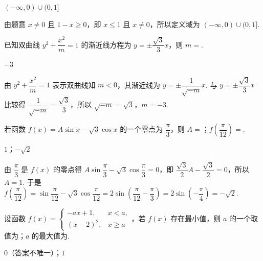 \begin{answer}
\((-\infty,0)\cup(0,1]\)
\end{answer}

\begin{solution}
由题意 \(x\ne0\) 且 \(1-x\ge0\)，即 \(x\le1\) 且 \(x\ne0\)，所以定义域为 \((-\infty,0)\cup(0,1]\).
\end{solution}

\begin{problem}
已知双曲线 \(y^2+\dfrac{x^2}{m}=1\) 的渐近线方程为 \(y=\pm \dfrac{\sqrt3}{3}x\)，则 \(m=\)\fillinblank{}.
\end{problem}

\begin{answer}
\(-3\)
\end{answer}

\begin{solution}
由 \(y^2+\dfrac{x^2}{m}=1\) 表示双曲线知 \(m<0\)，其渐近线为 \(y=\pm\dfrac{1}{\sqrt{-m}}x\). 与 \(y=\pm\dfrac{\sqrt3}{3}x\) 比较得 \(\dfrac{1}{\sqrt{-m}}=\dfrac{\sqrt3}{3}\)，所以 \(\sqrt{-m}=\sqrt3\)，\(m=-3\).
\end{solution}

\begin{problem}
若函数 \(f(x)=A\sin x-\sqrt3\cos x\) 的一个零点为 \(\dfrac{\pi}{3}\)，则 \(A=\)\fillinblank{}；\(f\left(\dfrac{\pi}{12}\right)=\)\fillinblank{}.
\end{problem}

\begin{answer}
\(1\)；\(-\sqrt{2}\)
\end{answer}

\begin{solution}
由 \(\dfrac\pi3\) 是 \(f(x)\) 的零点得 \(A\sin\dfrac\pi3-\sqrt3\cos\dfrac\pi3=0\)，即 \(\dfrac{\sqrt3}{2}A-\dfrac{\sqrt3}{2}=0\)，所以 \(A=1\). 于是 \(f\left(\dfrac\pi{12}\right)=\sin\dfrac\pi{12}-\sqrt3\cos\dfrac\pi{12}=2\sin\left(\dfrac\pi{12}-\dfrac\pi3\right)=2\sin\left(-\dfrac\pi4\right)=-\sqrt2\).
\end{solution}

\begin{problem}
设函数 \(f(x)=\begin{cases}
-ax+1,&x<a,\\
\left(x-2\right)^2,&x\ge a
\end{cases}\)，若 \(f(x)\) 存在最小值，则 \(a\) 的一个取值为\fillinblank{}；\(a\) 的最大值为\fillinblank{}.
\end{problem}

\begin{answer}
\(0\)（答案不唯一）；\(1\)
\end{answer}

